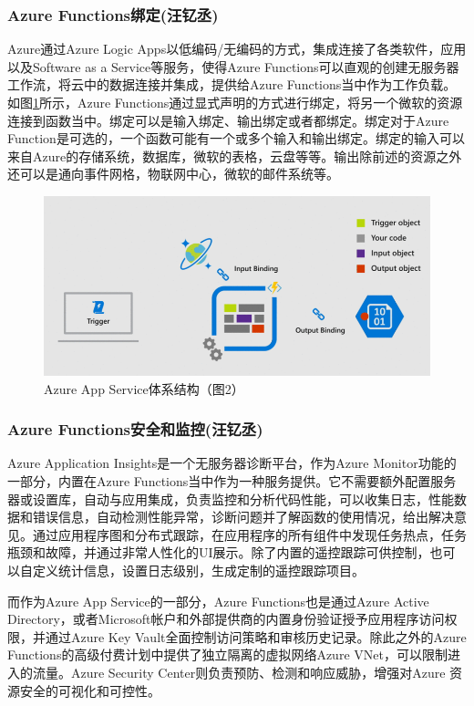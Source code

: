 \documentclass[11pt]{article}
\begin{document}
\subsubsection{Azure Functions绑定(汪钇丞)}
Azure通过Azure Logic Apps以低编码/无编码的方式，集成连接了各类软件，应用以及Software as a Service等服务，使得Azure Functions可以直观的创建无服务器工作流，将云中的数据连接并集成，提供给Azure Functions当中作为工作负载。如图\ref{figs:bind}所示，Azure Functions通过显式声明的方式进行绑定，将另一个微软的资源连接到函数当中。绑定可以是输入绑定、输出绑定或者都绑定。绑定对于Azure Function是可选的，一个函数可能有一个或多个输入和输出绑定。绑定的输入可以来自Azure的存储系统，数据库，微软的表格，云盘等等。输出除前述的资源之外还可以是通向事件网格，物联网中心，微软的邮件系统等。
\begin{figure}[!htbp]
	\centering
	\includegraphics[scale=0.5]{figs/AzureBindings.png}
	\caption{Azure App Service体系结构（\cite{binding}图2）}
	\label{figs:bind}
\end{figure}
\subsubsection{Azure Functions安全和监控(汪钇丞)}
Azure Application Insights是一个无服务器诊断平台，作为Azure Monitor功能的一部分，内置在Azure Functions当中作为一种服务提供。它不需要额外配置服务器或设置库，自动与应用集成，负责监控和分析代码性能，可以收集日志，性能数据和错误信息，自动检测性能异常，诊断问题并了解函数的使用情况，给出解决意见。通过应用程序图和分布式跟踪，在应用程序的所有组件中发现任务热点，任务瓶颈和故障，并通过非常人性化的UI展示。除了内置的遥控跟踪可供控制，也可以自定义统计信息，设置日志级别，生成定制的遥控跟踪项目。

而作为Azure App Service的一部分，Azure Functions也是通过Azure Active Directory，或者Microsoft帐户和外部提供商的内置身份验证授予应用程序访问权限，并通过Azure Key Vault全面控制访问策略和审核历史记录。除此之外的Azure Functions的高级付费计划中提供了独立隔离的虚拟网络Azure VNet，可以限制进入的流量。Azure Security Center则负责预防、检测和响应威胁，增强对Azure 资源安全的可视化和可控性。
\end{document}
